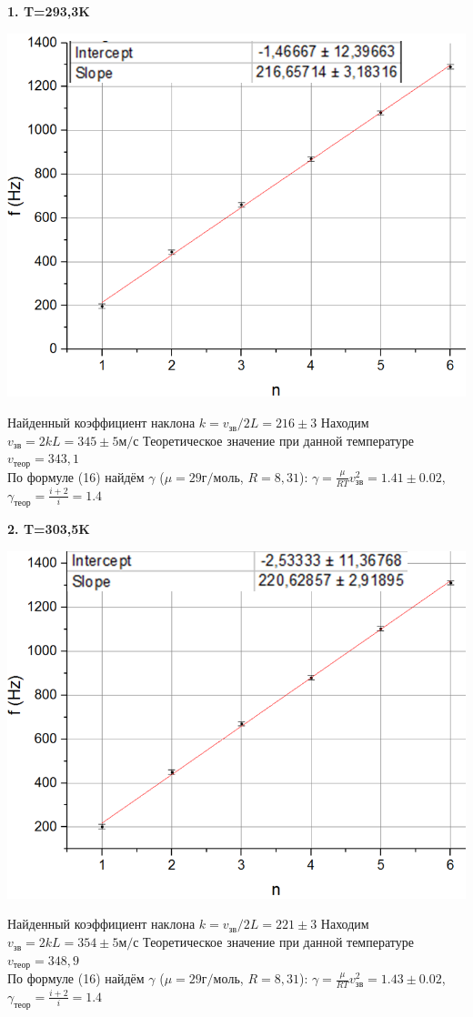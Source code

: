 \documentclass[12pt]{article}
\begin{document}
    \textbf{1. T=293,3K}\\
    \begin{center}
    	\includegraphics[width=14cm]{graph20.png}\\
    \end{center}
    Найденный коэффициент наклона $k = v_{зв}/2L = 216 \pm 3$
    Находим $v_{зв} = 2kL = 345 \pm 5 м/с$
    Теоретическое значение при данной температуре $v_{теор} = 343,1$\\
    По формуле (16) найдём $\gamma$ ($\mu = 29 г/моль$, $R=8,31$):
    $\gamma = \frac{\mu}{RT}v_{зв}^2 = 1.41 \pm 0.02$, $\gamma_{теор} = \frac{i+2}{i} = 1.4$
    
    \textbf{2. T=303,5K}
    \begin{center}
    	\includegraphics[width=14cm]{graph30.png}\\
    \end{center}
    Найденный коэффициент наклона $k = v_{зв}/2L = 221 \pm 3$
    Находим $v_{зв} = 2kL = 354 \pm 5 м/с$
    Теоретическое значение при данной температуре $v_{теор} = 348,9$\\
    По формуле (16) найдём $\gamma$ ($\mu = 29 г/моль$, $R=8,31$):
    $\gamma = \frac{\mu}{RT}v_{зв}^2 = 1.43 \pm 0.02$, $\gamma_{теор} = \frac{i+2}{i} = 1.4$
    
\end{document}
